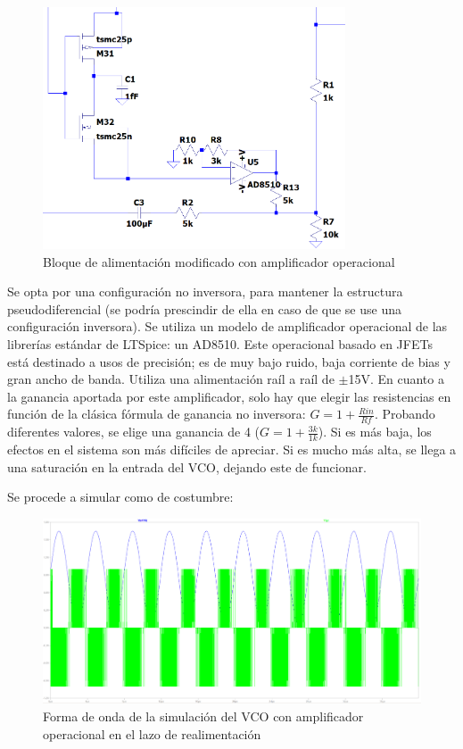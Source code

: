 \documentclass[12pt]{report} %
\begin{document}
	\begin{figure}[H]
		\includegraphics[width=0.8\textwidth]{vco-closed-opamp-block.png}
		\caption[Bloque de alimentación modificado con amplificador operacional]{Bloque de alimentación modificado con amplificador operacional}
		\label{fig:vco-closed-opamp-block.png}
	\end{figure}

	Se opta por una configuración no inversora, para mantener la estructura pseudodiferencial (se podría prescindir de ella en caso de que se use una configuración inversora). Se utiliza un modelo de amplificador operacional de las librerías estándar de LTSpice: un AD8510. Este operacional basado en JFETs está destinado a usos de precisión; es de muy bajo ruido, baja corriente de bias y gran ancho de banda. Utiliza una alimentación raíl a raíl de $\pm$15V. En cuanto a la ganancia aportada por este amplificador, solo hay que elegir las resistencias en función de la clásica fórmula de ganancia no inversora: $G = 1 + \frac{Rin}{Rf}$. Probando diferentes valores, se elige una ganancia de 4 ($G = 1 + \frac{3k}{1k}$). Si es más baja, los efectos en el sistema son más difíciles de apreciar. Si es mucho más alta, se llega a una saturación en la entrada del VCO, dejando este de funcionar.
	
	Se procede a simular como de costumbre:

	\begin{figure}[H]
		\includegraphics[width=\textwidth]{sim-vco-closed-opamp-waveform.png}
		\caption[Forma de onda de la simulación del VCO con amplificador operacional en el lazo de realimentación]{Forma de onda de la simulación del VCO con amplificador operacional en el lazo de realimentación}
		\label{fig:sim-vco-closed-opamp-waveform.png}
	\end{figure}
\end{document}
